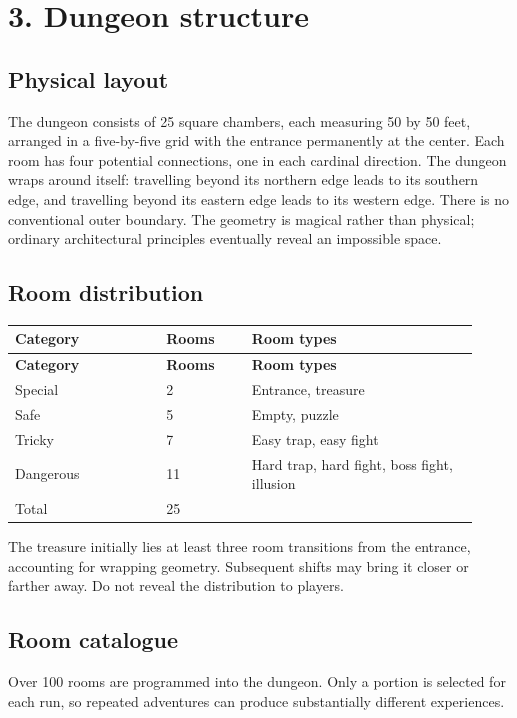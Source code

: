 \section{3. Dungeon structure}

\subsection{Physical layout}

The dungeon consists of 25 square chambers, each measuring 50 by 50 feet, arranged in a five-by-five grid with the entrance permanently at the center. Each room has four potential connections, one in each cardinal direction. The dungeon wraps around itself: travelling beyond its northern edge leads to its southern edge, and travelling beyond its eastern edge leads to its western edge. There is no conventional outer boundary. The geometry is magical rather than physical; ordinary architectural principles eventually reveal an impossible space.

\subsection{Room distribution}

\begin{longtable}{p{0.3\linewidth}p{0.17\linewidth}p{0.45\linewidth}}

\rowcolor{tablehead} \textbf{Category} & \textbf{Rooms} & \textbf{Room types} \\

\endfirsthead

\rowcolor{tablehead} \textbf{Category} & \textbf{Rooms} & \textbf{Room types} \\

\endhead

Special & 2 & Entrance, treasure \\

Safe & 5 & Empty, puzzle \\

Tricky & 7 & Easy trap, easy fight \\

Dangerous & 11 & Hard trap, hard fight, boss fight, illusion \\

Total & 25 &  \\

\end{longtable}

The treasure initially lies at least three room transitions from the entrance, accounting for wrapping geometry. Subsequent shifts may bring it closer or farther away. Do not reveal the distribution to players.

\subsection{Room catalogue}

Over 100 rooms are programmed into the dungeon. Only a portion is selected for each run, so repeated adventures can produce substantially different experiences.
